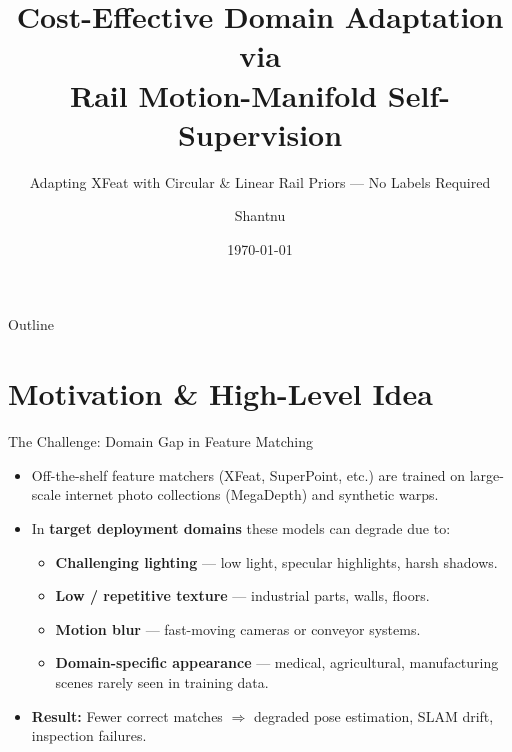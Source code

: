 \documentclass[aspectratio=169, 12pt]{beamer}
\title{Cost-Effective Domain Adaptation via\\Rail Motion-Manifold Self-Supervision}
\subtitle{Adapting XFeat with Circular \& Linear Rail Priors --- No Labels Required}
\author{Shantnu}
\date{\today}
\begin{document}
\begin{frame}
\titlepage
\end{frame}

\begin{frame}{Outline}
\tableofcontents
\end{frame}

\section{Motivation \& High-Level Idea}

\begin{frame}{The Challenge: Domain Gap in Feature Matching}
\small
\begin{itemize}\setlength{\itemsep}{3pt}
    \item Off-the-shelf feature matchers (XFeat, SuperPoint, etc.) are trained on
          large-scale internet photo collections (MegaDepth) and synthetic warps.
    \item In \textbf{target deployment domains} these models can degrade due to:
    \begin{itemize}\setlength{\itemsep}{1pt}
        \item \textbf{Challenging lighting} --- low light, specular highlights, harsh shadows.
        \item \textbf{Low / repetitive texture} --- industrial parts, walls, floors.
        \item \textbf{Motion blur} --- fast-moving cameras or conveyor systems.
        \item \textbf{Domain-specific appearance} --- medical, agricultural, manufacturing scenes
              rarely seen in training data.
    \end{itemize}
    \item \textbf{Result:} Fewer correct matches $\Rightarrow$ degraded pose estimation,
          SLAM drift, inspection failures.
\end{itemize}
\end{frame}
\end{document}
